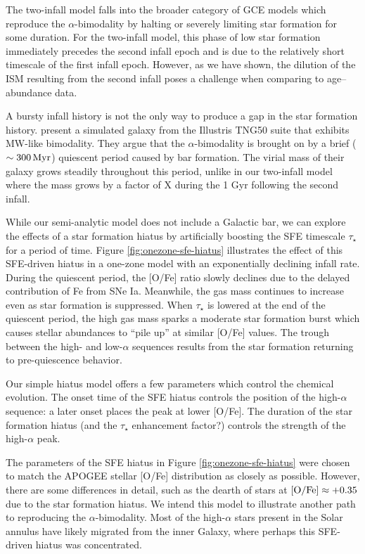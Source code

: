 \documentclass[twocolumn,twocolappendix,linenumbers]{aastex631}
\newcommand{\todo}[1]{{\color{red}#1}}
\newcommand{\mathOFe}{{\rm [O/Fe]}}
\begin{document}
The two-infall model falls into the broader category of GCE models which reproduce the $\alpha$-bimodality by halting or severely limiting star formation for some duration. For the two-infall model, this phase of low star formation immediately precedes the second infall epoch and is due to the relatively short timescale of the first infall epoch. However, as we have shown, the dilution of the ISM resulting from the second infall poses a challenge when comparing to age--abundance data.

A bursty infall history is not the only way to produce a gap in the star formation history. \citet{beane_rising_2024} present a simulated galaxy from the Illustris TNG50 suite that exhibits MW-like bimodality. They argue that the $\alpha$-bimodality is brought on by a brief ($\sim300\,{\rm Myr}$) quiescent period caused by bar formation. The virial mass of their galaxy grows steadily throughout this period, unlike in our two-infall model where the mass grows by a factor of \todo{X} during the 1 Gyr following the second infall.

While our semi-analytic model does not include a Galactic bar, we can explore the effects of a star formation hiatus by artificially boosting the SFE timescale $\tau_\star$ for a period of time. Figure \ref{fig:onezone-sfe-hiatus} illustrates the effect of this SFE-driven hiatus in a one-zone model with an exponentially declining infall rate. During the quiescent period, the [O/Fe] ratio slowly declines due to the delayed contribution of Fe from SNe Ia. Meanwhile, the gas mass continues to increase even as star formation is suppressed. When $\tau_\star$ is lowered at the end of the quiescent period, the high gas mass sparks a moderate star formation burst which causes stellar abundances to ``pile up'' at similar [O/Fe] values. The trough between the high- and low-$\alpha$ sequences results from the star formation returning to pre-quiescence behavior.

Our simple hiatus model offers a few parameters which control the chemical evolution. The onset time of the SFE hiatus controls the position of the high-$\alpha$ sequence: a later onset places the peak at lower [O/Fe]. The duration of the star formation hiatus \todo{(and the $\tau_\star$ enhancement factor?)} controls the strength of the high-$\alpha$ peak.

The parameters of the SFE hiatus in Figure \ref{fig:onezone-sfe-hiatus} were chosen to match the APOGEE stellar [O/Fe] distribution as closely as possible. However, there are some differences in detail, such as the dearth of stars at $\mathOFe\approx+0.35$ due to the star formation hiatus. We intend this model to illustrate another path to reproducing the $\alpha$-bimodality. Most of the high-$\alpha$ stars present in the Solar annulus have likely migrated from the inner Galaxy, where perhaps this SFE-driven hiatus was concentrated.
\end{document}
